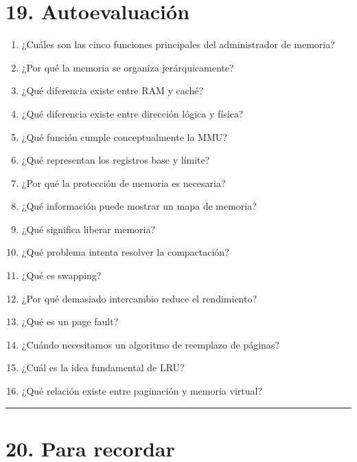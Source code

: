\documentclass[
  spanish,
  letterpaper,
]{scrbook}
\providecommand{\tightlist}{%
  \setlength{\itemsep}{0pt}\setlength{\parskip}{0pt}}
\begin{document}

\chapter{19. Autoevaluación}\label{autoevaluaciuxf3n-9}

\begin{enumerate}
\def\labelenumi{\arabic{enumi}.}
\tightlist
\item
  ¿Cuáles son las cinco funciones principales del administrador de
  memoria?
\item
  ¿Por qué la memoria se organiza jerárquicamente?
\item
  ¿Qué diferencia existe entre RAM y caché?
\item
  ¿Qué diferencia existe entre dirección lógica y física?
\item
  ¿Qué función cumple conceptualmente la MMU?
\item
  ¿Qué representan los registros base y límite?
\item
  ¿Por qué la protección de memoria es necesaria?
\item
  ¿Qué información puede mostrar un mapa de memoria?
\item
  ¿Qué significa liberar memoria?
\item
  ¿Qué problema intenta resolver la compactación?
\item
  ¿Qué es swapping?
\item
  ¿Por qué demasiado intercambio reduce el rendimiento?
\item
  ¿Qué es un page fault?
\item
  ¿Cuándo necesitamos un algoritmo de reemplazo de páginas?
\item
  ¿Cuál es la idea fundamental de LRU?
\item
  ¿Qué relación existe entre paginación y memoria virtual?
\end{enumerate}

\begin{center}\rule{0.5\linewidth}{0.5pt}\end{center}


\chapter{20. Para recordar}\label{para-recordar-5}
\end{document}
